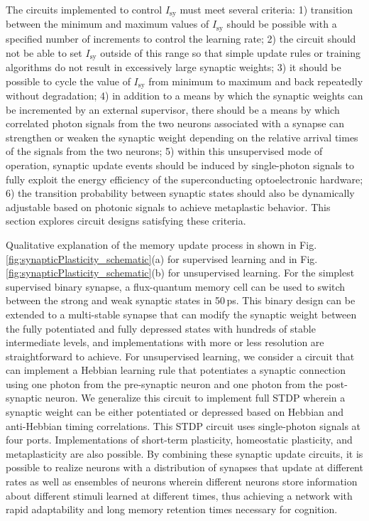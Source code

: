 \documentclass[twocolumn]{article}
\begin{document}
The circuits implemented to control $I_{\mathrm{sy}}$ must meet several criteria: 1) transition between the minimum and maximum values of $I_{\mathrm{sy}}$ should be possible with a specified number of increments to control the learning rate; 2) the circuit should not be able to set $I_{\mathrm{sy}}$ outside of this range so that simple update rules or training algorithms do not result in excessively large synaptic weights; 3) it should be possible to cycle the value of $I_{\mathrm{sy}}$ from minimum to maximum and back repeatedly without degradation; 4) in addition to a means by which the synaptic weights can be incremented by an external supervisor, there should be a means by which correlated photon signals from the two neurons associated with a synapse can strengthen or weaken the synaptic weight depending on the relative arrival times of the signals from the two neurons; 5) within this unsupervised mode of operation, synaptic update events should be induced by single-photon signals to fully exploit the energy efficiency of the superconducting optoelectronic hardware; 6) the transition probability between synaptic states should also be dynamically adjustable based on photonic signals to achieve metaplastic behavior. This section explores circuit designs satisfying these criteria.

Qualitative explanation of the memory update process in shown in Fig.\,\ref{fig:synapticPlasticity_schematic}(a) for supervised learning and in Fig.\,\ref{fig:synapticPlasticity_schematic}(b) for unsupervised learning. For the simplest supervised binary synapse, a flux-quantum memory cell can be used to switch between the strong and weak synaptic states in 50\,ps. This binary design can be extended to a multi-stable synapse that can modify the synaptic weight between the fully potentiated and fully depressed states with hundreds of stable intermediate levels, and implementations with more or less resolution are straightforward to achieve. For unsupervised learning, we consider a circuit that can implement a Hebbian learning rule that potentiates a synaptic connection using one photon from the pre-synaptic neuron and one photon from the post-synaptic neuron. We generalize this circuit to implement full STDP wherein a synaptic weight can be either potentiated or depressed based on Hebbian and anti-Hebbian timing correlations. This STDP circuit uses single-photon signals at four ports. Implementations of short-term plasticity, homeostatic plasticity, and metaplasticity are also possible. By combining these synaptic update circuits, it is possible to realize neurons with a distribution of synapses that update at different rates as well as ensembles of neurons wherein different neurons store information about different stimuli learned at different times, thus achieving a network with rapid adaptability and long memory retention times necessary for cognition. 
	
\end{document}
